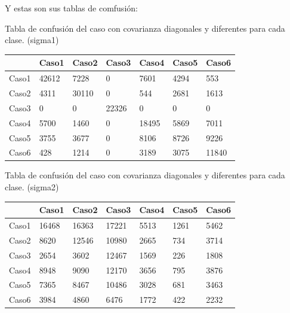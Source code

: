 \documentclass[a4paper,10pt]{article}
\begin{document}
Y estas son sus tablas de comfusi\'on:

Tabla de confusi\'on del caso con covarianza diagonales y diferentes para cada clase. (sigma1)\newline
\begin{tabular}{| l | l | l | l | l | l | l | }
& Caso1 & Caso2 & Caso3 & Caso4 & Caso5 & Caso6\\ \hline
Caso1 &       42612       & 7228      &     0&        7601     &   4294&         553\\ \hline
Caso2 &        4311       &30110     &      0 &        544    &    2681 &       1613\\ \hline
Caso3 &           0        &   0    &   22326  &         0   &        0  &         0\\ \hline
Caso4 &        5700        &1460   &        0   &    18495  &      5869   &     7011\\ \hline
Caso5 &        3755        &3677  &         0    &    8106 &       8726    &    9226\\ \hline
Caso6 &         428        &1214 &          0     &   3189&        3075     &  11840\\ \hline


\end{tabular}\newline

Tabla de confusi\'on del caso con covarianza diagonales y diferentes para cada clase. (sigma2)\newline
\begin{tabular}{| l | l | l | l | l | l | l | }
& Caso1 & Caso2 & Caso3 & Caso4 & Caso5 & Caso6\\ \hline
Caso1 &       16468       &16363       &17221        &5513        &1261        &5462\\ \hline
Caso2 &        8620       &12546       &10980        &2665         &734        &3714\\ \hline
Caso3 &        2654        &3602       &12467        &1569         &226        &1808\\ \hline
Caso4 &        8948        &9090       &12170        &3656         &795        &3876\\ \hline
Caso5 &        7365        &8467       &10486        &3028         &681        &3463\\ \hline
Caso6 &        3984       & 4860        &6476        &1772         &422        &2232\\ \hline
\end{tabular}
\end{document}
